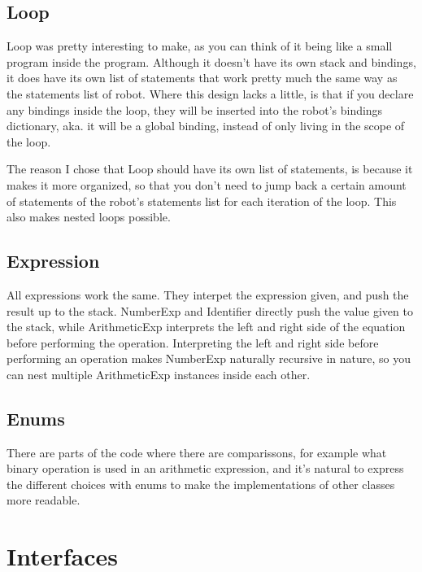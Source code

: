\documentclass[letterpaper,10pt,english]{sphinxmanual}
\begin{document}
\section{Loop}
\label{\detokenize{design:loop}}
\sphinxAtStartPar
Loop was pretty interesting to make, as you can think of it being like a small program inside the program. Although it doesn’t have its own stack and bindings, it does have its own list of statements that work pretty much the same way as the statements list of robot.
Where this design lacks a little, is that if you declare any bindings inside the loop, they will be inserted into the robot’s bindings dictionary, aka. it will be a global binding, instead of only living in the scope of the loop.

\sphinxAtStartPar
The reason I chose that Loop should have its own list of statements, is because it makes it more organized, so that you don’t need to jump back a certain amount of statements of the robot’s statements list for each iteration of the loop. This also makes nested loops possible.


\section{Expression}
\label{\detokenize{design:expression}}
\sphinxAtStartPar
All expressions work the same. They interpet the expression given, and push the result up to the stack.
NumberExp and Identifier directly push the value given to the stack, while ArithmeticExp interprets the left and right side of the equation before performing the operation. Interpreting the left and right side before performing an operation makes NumberExp naturally recursive in nature, so you can nest multiple ArithmeticExp instances inside each other.


\section{Enums}
\label{\detokenize{design:enums}}
\sphinxAtStartPar
There are parts of the code where there are comparissons, for example what binary operation is used in an arithmetic expression, and it’s natural to express the different choices with enums to make the implementations of other classes more readable.


\chapter{Interfaces}
\label{\detokenize{interfaces:module-robol_lang.interfaces}}\label{\detokenize{interfaces:interfaces}}\label{\detokenize{interfaces::doc}}
\end{document}
